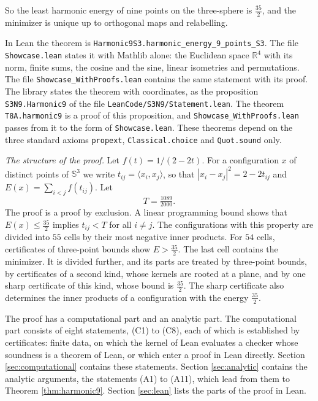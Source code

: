 \documentclass[reqno,a4paper,11pt]{amsart}
\numberwithin{equation}{section}
\def\R{{\mathbb R}}
\newcommand{\Sph}{\mathbb{S}}
\newcommand{\lean}[1]{\texttt{#1}}
\newcommand{\file}[1]{\nolinkurl{#1}}
\begin{document}
So the least harmonic energy of nine points on the three-sphere is $\tfrac{35}{2}$, and the minimizer is unique up to orthogonal maps and relabelling.

{\sloppy In Lean the theorem is \lean{Harmonic9S3.harmonic\_energy\_9\_points\_S3}. The file \file{Showcase.lean} states it with Mathlib alone: the Euclidean space $\R^4$ with its norm, finite sums, the cosine and the sine, linear isometries and permutations. The file \file{Showcase_WithProofs.lean} contains the same statement with its proof. The library states the theorem with coordinates, as the proposition \lean{S3N9.Harmonic9} of the file \file{LeanCode/S3N9/Statement.lean}. The theorem \lean{T8A.harmonic9} is a proof of this proposition, and \file{Showcase_WithProofs.lean} passes from it to the form of \file{Showcase.lean}. These theorems depend on the three standard axioms \lean{propext}, \lean{Classical.choice} and \lean{Quot.sound} only.\par}

\emph{The structure of the proof.} Let $f(t) = 1/(2-2t)$. For a configuration $x$ of distinct points of $\Sph^3$ we write $t_{ij} = \langle x_i, x_j \rangle$, so that $|x_i - x_j|^2 = 2 - 2 t_{ij}$ and $E(x) = \sum_{i<j} f(t_{ij})$. Let
$$
T = \tfrac{1089}{2000} .
$$
The proof is a proof by exclusion. A linear programming bound shows that $E(x) \leq \tfrac{35}{2}$ implies $t_{ij} < T$ for all $i \neq j$. The configurations with this property are divided into $55$ cells by their most negative inner products. For $54$ cells, certificates of three-point bounds show $E > \tfrac{35}{2}$. The last cell contains the minimizer. It is divided further, and its parts are treated by three-point bounds, by certificates of a second kind, whose kernels are rooted at a plane, and by one sharp certificate of this kind, whose bound is $\tfrac{35}{2}$. The sharp certificate also determines the inner products of a configuration with the energy $\tfrac{35}{2}$.

The proof has a computational part and an analytic part. The computational part consists of eight statements, (C1) to (C8), each of which is established by certificates: finite data, on which the kernel of Lean evaluates a checker whose soundness is a theorem of Lean, or which enter a proof in Lean directly. Section \ref{sec:computational} contains these statements. Section \ref{sec:analytic} contains the analytic arguments, the statements (A1) to (A11), which lead from them to Theorem \ref{thm:harmonic9}. Section \ref{sec:lean} lists the parts of the proof in Lean.
\end{document}
